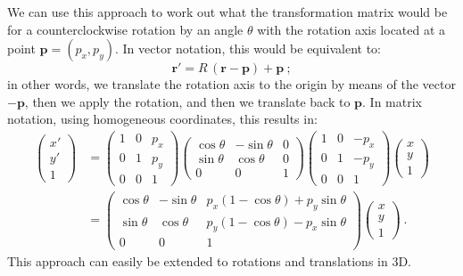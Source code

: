 We can use this approach to work out what the transformation matrix would be for a counterclockwise rotation by an angle $\theta$ with the rotation axis located at a point $\mathbf{p}=(p_x,p_y)$. In vector notation, this would be equivalent to:
\[
	\mathbf{r}' = R\,(\mathbf{r}-\mathbf{p}) + \mathbf{p}\ ;
\]
in other words, we translate the rotation axis to the origin by means of the vector $-\mathbf{p}$, then we apply the rotation, and then we translate back to $\mathbf{p}$. In matrix notation, using homogeneous coordinates, this results in:
\begin{equation*}
\begin{split}
	\begin{pmatrix}x'\\ y'\\ 1\end{pmatrix} &= 
	\begin{pmatrix} 1 & 0 & p_x\\ 0 & 1 & p_y\\ 0&0&1\end{pmatrix}
	\begin{pmatrix} \cos\theta & -\sin\theta & 0\\ \sin\theta & \cos\theta & 0\\ 0&0&1\end{pmatrix} 
	\begin{pmatrix} 1& 0 & -p_x\\ 0 & 1 & -p_y\\ 0&0&1\end{pmatrix}
	\begin{pmatrix}x\\ y\\ 1\end{pmatrix}\\
	& = 	\begin{pmatrix} \cos\theta & -\sin\theta & p_x(1-\cos\theta)+p_y\sin\theta\\ \sin\theta & \cos\theta & p_y(1-\cos\theta)-p_x\sin\theta\\ 0&0&1\end{pmatrix} 	\begin{pmatrix}x\\ y\\ 1\end{pmatrix}\ .
\end{split}
\end{equation*}
This approach can easily be extended to rotations and translations in 3D.


